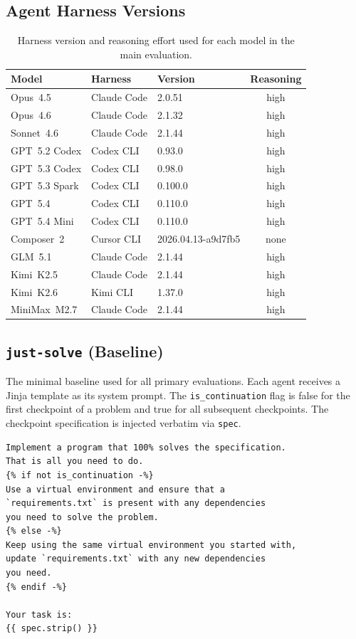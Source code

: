\subsection{Agent Harness Versions}\label{sec:agent-versions}

\begin{table}[h]
\centering
\caption{Harness version and reasoning effort used for each model in the main evaluation.}
\label{tab:agent-versions}
\small
\begin{tabular}{lllc}
\toprule
Model & Harness & Version & Reasoning \\
\midrule
Opus~4.5      & Claude Code & 2.0.51  & high \\
Opus~4.6      & Claude Code & 2.1.32  & high \\
Sonnet~4.6    & Claude Code & 2.1.44  & high \\
\midrule
GPT~5.2 Codex & Codex CLI & 0.93.0  & high \\
GPT~5.3 Codex & Codex CLI & 0.98.0  & high \\
GPT~5.3 Spark & Codex CLI & 0.100.0 & high \\
GPT~5.4       & Codex CLI & 0.110.0 & high \\
GPT~5.4 Mini  & Codex CLI & 0.110.0 & high \\
\midrule
Composer~2    & Cursor CLI  & 2026.04.13-a9d7fb5 & none \\
GLM~5.1       & Claude Code & 2.1.44  & high \\
Kimi~K2.5     & Claude Code & 2.1.44  & high \\
Kimi~K2.6     & Kimi CLI    & 1.37.0  & high \\
MiniMax~M2.7  & Claude Code & 2.1.44  & high \\
\bottomrule
\end{tabular}
\end{table}

\subsection{\texttt{just-solve} (Baseline)}\label{sec:prompt-intervention-raw}

The minimal baseline used for all primary evaluations. Each agent receives a Jinja template as its system prompt. The \texttt{is\_continuation} flag is false for the first checkpoint of a problem and true for all subsequent checkpoints. The checkpoint specification is injected verbatim via \texttt{spec}.

\begin{lstlisting}[style=specblock, caption={\texttt{just-solve} prompt template}, label={lst:just-solve-prompt}]
Implement a program that 100% solves the specification.
That is all you need to do.
{% if not is_continuation -%}
Use a virtual environment and ensure that a
`requirements.txt` is present with any dependencies
you need to solve the problem.
{% else -%}
Keep using the same virtual environment you started with,
update `requirements.txt` with any new dependencies
you need.
{% endif -%}

Your task is:
{{ spec.strip() }}
\end{lstlisting}

